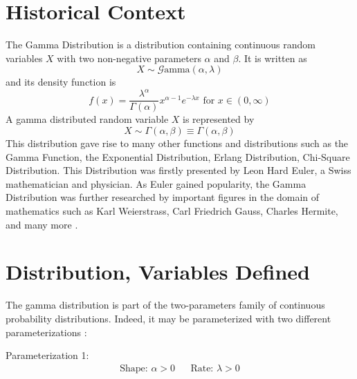 \documentclass[12pt]{article}
\newcommand{\G}{\mathcal{G}}
\begin{document}
\singlespacing

\tableofcontents\pagebreak
\doublespacing
\section{Historical Context}
The Gamma Distribution is a distribution containing continuous random variables $X$ with two non-negative parameters
$\alpha$ and $\beta$. It is written as
\begin{equation*}
	X\sim\G\text{amma}(\alpha, \lambda)
\end{equation*}
and its density function is
\begin{equation*}
	f(x)=\frac{\lambda^\alpha}{\Gamma(\alpha)}x^{\alpha-1}e^{-\lambda x}\text{ for }x\in(0,\infty)
\end{equation*}
A gamma distributed
random variable $X$ is represented by
\begin{equation*}
	X\sim\Gamma(\alpha,\beta)\equiv\Gamma(\alpha,\beta)
\end{equation*}
This distribution gave rise to many other functions and distributions such as the Gamma Function, the Exponential
Distribution, Erlang Distribution, Chi-Square Distribution. This Distribution was firstly presented by Leon Hard Euler,
a Swiss mathematician and physician. As Euler gained popularity, the Gamma Distribution was further researched by
important figures in the domain of mathematics such as Karl Weierstrass, Carl Friedrich Gauss, Charles Hermite, and many
more\cite{hoschGammaDistribution2017, wikipediaGammaDistribution2022, sebahIntroductionGammaFunction2002} .

\pagebreak
\section{Distribution, Variables Defined}
The gamma distribution is part of the two-parameters family of continuous probability distributions. Indeed, it may be
parameterized with two different parameterizations\cite{wikipediaGammaDistribution2022} :

\noindent Parameterization 1:
\vspace*{-24pt}
\begin{align}\label{eq:gamma:parameterization:1}
	\text{Shape: } \alpha>0		&&	\text{Rate: }\lambda>0
\end{align}
\end{document}
